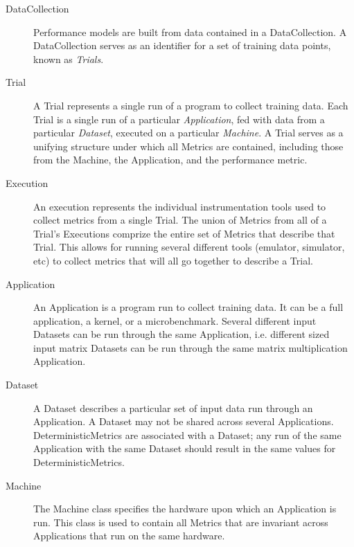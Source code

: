 \begin{description}
\item[DataCollection]Performance models are built from data contained in a
DataCollection. A DataCollection serves as an identifier for a set of training
data points, known as {\em Trials}.

\item[Trial] A Trial represents a single run of a program to collect training data.
Each Trial is a single run of a particular {\em Application}, fed with data from a
particular {\em Dataset}, executed on a particular {\em Machine}.
A Trial serves as a unifying structure under which all
Metrics are contained, including those from the Machine, the Application, and
the performance metric.

\item[Execution] An execution represents the individual instrumentation tools used
to collect metrics from a single Trial. The union of Metrics from all of a
Trial's Executions comprize the entire set of Metrics that describe that Trial.
This allows for running several different tools (emulator, simulator, etc) to
collect metrics that will all go together to describe a Trial.

\item[Application] An Application is a program run to collect training data. It can
be a full application, a kernel, or a microbenchmark.  Several different input
Datasets can be run through the same Application, i.e. different sized input
matrix Datasets can be run through the same matrix multiplication Application.

\item[Dataset] A Dataset describes a particular set of input data run through an
Application. A Dataset may not be shared across several Applications.
DeterministicMetrics are associated with a Dataset; any run of the same
Application with the same Dataset should result in the same values for
DeterministicMetrics.

\item[Machine] The Machine class specifies the hardware upon which an Application is
run. This class is used to contain all Metrics that are invariant across
Applications that run on the same hardware.


\end{description}
